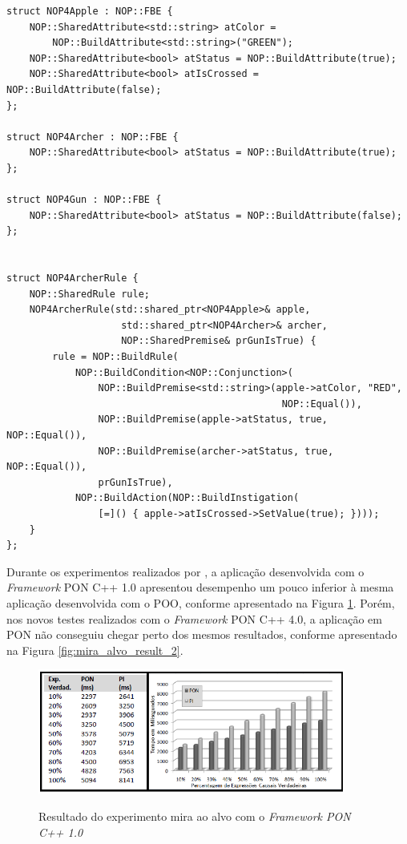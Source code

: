 \begin{lstlisting}[caption = {Código da estrutura do mira ao alvo com o \textit{Framework} PON C++ 4.0},
source = {Autoria própria},
label = {cod:mira_alvo}]
struct NOP4Apple : NOP::FBE {
    NOP::SharedAttribute<std::string> atColor =
        NOP::BuildAttribute<std::string>("GREEN");
    NOP::SharedAttribute<bool> atStatus = NOP::BuildAttribute(true);
    NOP::SharedAttribute<bool> atIsCrossed = NOP::BuildAttribute(false);
};

struct NOP4Archer : NOP::FBE {
    NOP::SharedAttribute<bool> atStatus = NOP::BuildAttribute(true);
};

struct NOP4Gun : NOP::FBE {
    NOP::SharedAttribute<bool> atStatus = NOP::BuildAttribute(false);
};


struct NOP4ArcherRule {
    NOP::SharedRule rule;    
    NOP4ArcherRule(std::shared_ptr<NOP4Apple>& apple,
                    std::shared_ptr<NOP4Archer>& archer,
                    NOP::SharedPremise& prGunIsTrue) {
        rule = NOP::BuildRule(
            NOP::BuildCondition<NOP::Conjunction>(
                NOP::BuildPremise<std::string>(apple->atColor, "RED",
                                                NOP::Equal()),
                NOP::BuildPremise(apple->atStatus, true, NOP::Equal()),
                NOP::BuildPremise(archer->atStatus, true, NOP::Equal()),
                prGunIsTrue),
            NOP::BuildAction(NOP::BuildInstigation(
                [=]() { apple->atIsCrossed->SetValue(true); })));
    }
};
\end{lstlisting}

Durante os experimentos realizados por , a
aplicação desenvolvida com o \textit{Framework} PON C++ 1.0 apresentou
desempenho um pouco inferior à mesma aplicação desenvolvida com o POO, conforme
apresentado na Figura \ref{fig:mira_alvo_result}. Porém, nos novos testes
realizados com o \textit{Framework} PON C++ 4.0, a aplicação em PON não
conseguiu chegar perto dos mesmos resultados, conforme apresentado na Figura
\ref{fig:mira_alvo_result_2}.

\begin{figure}[!htb]
\centering
\caption{Resultado do experimento mira ao alvo com o \textit{Framework PON C++ 1.0}}
\includegraphics[width=0.9\textwidth]{../figures/mira_alvo_result.PNG}
\smallskip
{}
\label{fig:mira_alvo_result}
\end{figure}

